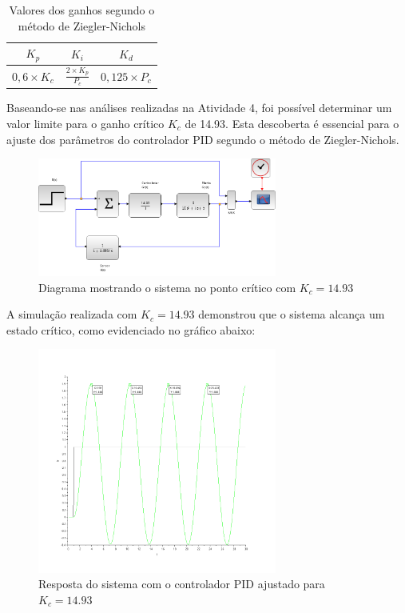 \begin{table}[h]
    \centering
    \begin{tabular}{ccc}
        \hline
        \( K_p \)            & \( K_i \)                      & \( K_d \)              \\
        \hline
        \( 0,6 \times K_c \) & \( \frac{2 \times K_p}{P_c} \) & \( 0,125 \times P_c \) \\
        \hline
    \end{tabular}
    \caption{Valores dos ganhos segundo o método de Ziegler-Nichols}
    \label{tab:ziegler-nichols}
\end{table}

Baseando-se nas análises realizadas na Atividade 4, foi possível determinar um valor limite para o ganho crítico \( K_c \) de 14.93. Esta descoberta é essencial para o ajuste dos parâmetros do controlador PID segundo o método de Ziegler-Nichols.

\begin{figure}[H]
    \centering
    \includegraphics[width=0.7\textwidth]{6-atividade/assets/diagrama-a.png}
    \caption{Diagrama mostrando o sistema no ponto crítico com \( K_c = 14.93 \)}
    \label{fig:diagrama-ponto-critico}
\end{figure}

A simulação realizada com \( K_c = 14.93 \) demonstrou que o sistema alcança um estado crítico, como evidenciado no gráfico abaixo:


\begin{figure}[H]
    \centering
    \includegraphics[width=0.7\textwidth]{6-atividade/assets/instavel-posicao-sistema-controlador.png}
    \caption{Resposta do sistema com o controlador PID ajustado para \( K_c = 14.93 \)}
    \label{fig:resposta-sistema-controlador}
\end{figure}


